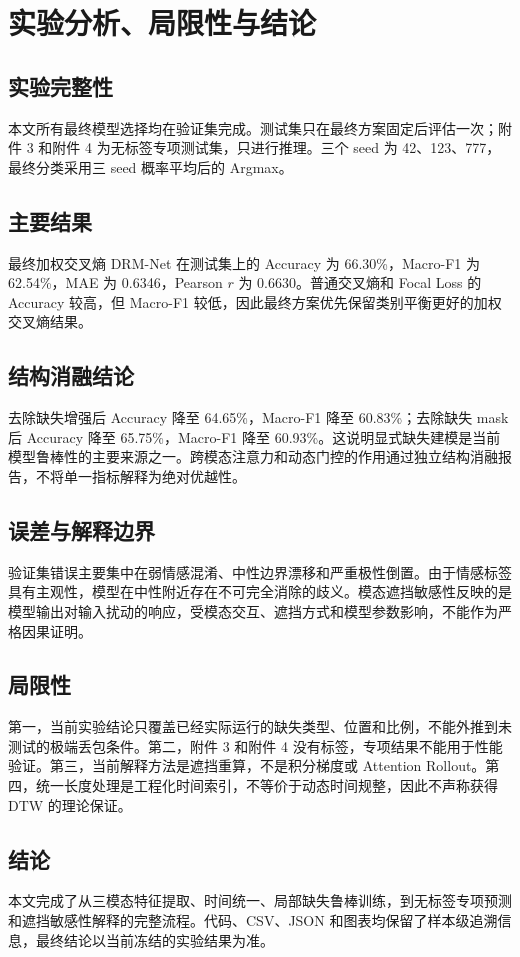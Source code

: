 \section{实验分析、局限性与结论}

\subsection{实验完整性}
本文所有最终模型选择均在验证集完成。测试集只在最终方案固定后评估一次；附件 3 和附件 4 为无标签专项测试集，只进行推理。三个 seed 为 42、123、777，最终分类采用三 seed 概率平均后的 Argmax。

\subsection{主要结果}
最终加权交叉熵 DRM-Net 在测试集上的 Accuracy 为 66.30\%，Macro-F1 为 62.54\%，MAE 为 0.6346，Pearson $r$ 为 0.6630。普通交叉熵和 Focal Loss 的 Accuracy 较高，但 Macro-F1 较低，因此最终方案优先保留类别平衡更好的加权交叉熵结果。

\subsection{结构消融结论}
去除缺失增强后 Accuracy 降至 64.65\%，Macro-F1 降至 60.83\%；去除缺失 mask 后 Accuracy 降至 65.75\%，Macro-F1 降至 60.93\%。这说明显式缺失建模是当前模型鲁棒性的主要来源之一。跨模态注意力和动态门控的作用通过独立结构消融报告，不将单一指标解释为绝对优越性。

\subsection{误差与解释边界}
验证集错误主要集中在弱情感混淆、中性边界漂移和严重极性倒置。由于情感标签具有主观性，模型在中性附近存在不可完全消除的歧义。模态遮挡敏感性反映的是模型输出对输入扰动的响应，受模态交互、遮挡方式和模型参数影响，不能作为严格因果证明。

\subsection{局限性}
第一，当前实验结论只覆盖已经实际运行的缺失类型、位置和比例，不能外推到未测试的极端丢包条件。第二，附件 3 和附件 4 没有标签，专项结果不能用于性能验证。第三，当前解释方法是遮挡重算，不是积分梯度或 Attention Rollout。第四，统一长度处理是工程化时间索引，不等价于动态时间规整，因此不声称获得 DTW 的理论保证。

\subsection{结论}
本文完成了从三模态特征提取、时间统一、局部缺失鲁棒训练，到无标签专项预测和遮挡敏感性解释的完整流程。代码、CSV、JSON 和图表均保留了样本级追溯信息，最终结论以当前冻结的实验结果为准。

